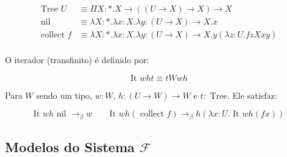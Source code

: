 \documentclass[../main.tex]{subfiles}
\begin{document}
\begin{align*}
    \text{Tree } U    & \equiv \Pi X : \ast . X \to ((U \to X) \to X) \to X \\
    \text{nil }       & \equiv \lambda X : \ast . \lambda x : X . \lambda y : (U \to X) \to X . x \\
    \text{collect } f & \equiv \lambda X : \ast . \lambda x : X . \lambda y : (U \to X) \to X . y (\lambda z : U . fzXxy) \\
\end{align*}

O iterador (transfinito) é definido por:

$$\text{It } wht \equiv tWwh$$

Para $W$ sendo um tipo, $w : W$, $h : (U \to W) \to W$ e $t : \text{ Tree}$. Ele satisfaz:

$$\text{It } w h \text{ nil } \to_{\beta} w \qquad \text{It } w h (\text{ collect } f) \to_{\beta} h (\lambda x : U . \text{ It } w h (fx))$$

\subsection{Modelos do Sistema \texorpdfstring{$\mathcal{F}$}{F}}
\end{document}
